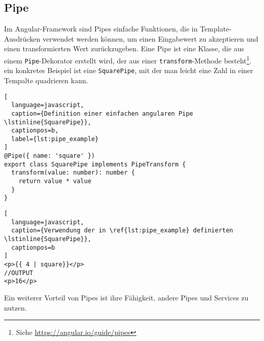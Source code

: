 \subsection{Pipe}

Im Angular-Framework sind Pipes einfache Funktionen, die in Template-Ausdrücken verwendet werden können, um einen Eingabewert zu akzeptieren und einen transformierten Wert zurückzugeben.
Eine Pipe ist eine Klasse, die aus einem \lstinline{Pipe}-Dekorator erstellt wird, der aus einer \lstinline{transform}-Methode besteht\footnote{Siehe \href{https://angular.io/guide/pipes}{https://angular.io/guide/pipes}}.
ein konkretes Beispiel ist eine \lstinline{SquarePipe}, mit der man leicht eine Zahl in einer Tempalte quadrieren kann.

\begin{lstlisting}[
  language=javascript,
  caption={Definition einer einfachen angularen Pipe \lstinline{SquarePipe}},
  captionpos=b,
  label={lst:pipe_example}
]
@Pipe({ name: 'square' })
export class SquarePipe implements PipeTransform {
  transform(value: number): number {
    return value * value
  }
}
\end{lstlisting}

\begin{lstlisting}[
  language=javascript,
  caption={Verwendung der in \ref{lst:pipe_example} definierten \lstinline{SquarePipe}},
  captionpos=b
]
<p>{{ 4 | square}}</p>
//OUTPUT
<p>16</p>
\end{lstlisting}

Ein weiterer Vorteil von Pipes ist ihre Fähigkeit, andere Pipes und Services zu nutzen.
